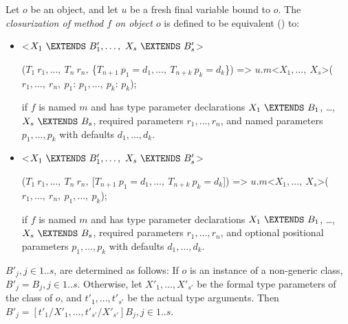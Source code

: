 \documentclass{article}
\begin{document}
\LMHash{}
Let $o$ be an object, and let $u$ be a fresh final variable bound to $o$.
The {\em closurization of method $f$ on object $o$} is defined to be equivalent
() to:
\begin{itemize}
\item
\begin{dartCode}
<$X_1\ \EXTENDS\ B'_1, \ldots,\ X_s\ \EXTENDS\ B'_s$>

($T_1\ r_1, \ldots,\ T_n\ r_n,\ $\{$T_{n+1}\ p_1 = d_1, \ldots,\ T_{n+k}\ p_k = d_k$\}) =>
    $u.m$<$X_1, \ldots,\ X_s$>($r_1, \ldots,\ r_n,\ p_1$: $p_1, \ldots,\ p_k$: $p_k$);
\end{dartCode}
if $f$ is named $m$ and has type parameter declarations
$X_1\ \EXTENDS\ B_1$, \ldots,\ $X_s\ \EXTENDS\ B_s$,
required parameters $r_1, \ldots, r_n$,
and named parameters $p_1, \ldots, p_k$ with defaults $d_1, \ldots, d_k$.
\item
\begin{dartCode}
<$X_1\ \EXTENDS\ B'_1, \ldots,\ X_s\ \EXTENDS\ B'_s$>

($T_1\ r_1, \ldots,\ T_n\ r_n,\ $[$T_{n+1}\ p_1 = d_1, \ldots,\ T_{n+k}\ p_k = d_k$]) =>
    $u.m$<$X_1, \ldots,\ X_s$>($r_1, \ldots,\ r_n,\ p_1, \ldots,\ p_k$);
\end{dartCode}
if $f$ is named $m$ and has type parameter declarations
$X_1\ \EXTENDS\ B_1$, \ldots,\ $X_s\ \EXTENDS\ B_s$,
required parameters $r_1, \ldots, r_n$,
and optional positional parameters
$p_1, \ldots, p_k$ with defaults $d_1, \ldots, d_k$.
\end{itemize}

\LMHash{}
$B'_j, j \in 1 .. s$, are determined as follows:
If $o$ is an instance of a non-generic class, $B'_j = B_j, j \in 1 .. s$.
Otherwise, let $X'_1, \ldots, X'_{s'}$ be the formal type parameters of the class of $o$,
and $t'_1, \ldots, t'_{s'}$ be the actual type arguments.
Then $B'_j = [t'_1/X'_1, \ldots, t'_{s'}/X'_{s'}]B_j, j \in 1 .. s$.
\end{document}
